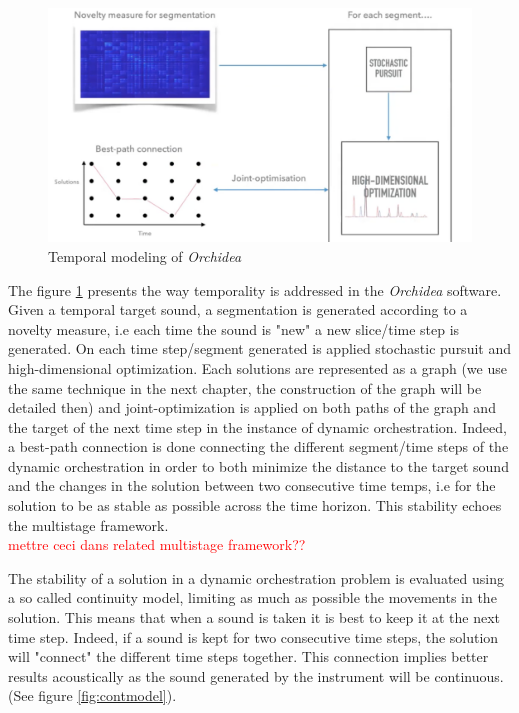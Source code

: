 \documentclass[a4paper]{book}
\newcommand{\alex}[2]{\textcolor{red}{#1}}
\begin{document}
\begin{figure}[ht!]
    \centering
    \includegraphics[scale=0.3]{tempmodel.png}
    \caption{Temporal modeling of \textit{Orchidea}}
    \label{fig:tempmodel}
\end{figure}

The figure \ref{fig:tempmodel} presents the way temporality is addressed in the \textit{Orchidea} software.
Given a temporal target sound, a segmentation is generated according to a novelty measure, i.e each time the sound is "new" a new slice/time step is generated. On each time step/segment generated is applied stochastic pursuit and high-dimensional optimization. Each solutions are represented as a graph (we use the same technique in the next chapter, the construction of the graph will be detailed then) and joint-optimization is applied on both paths of the graph and the target of the next time step in the instance of dynamic orchestration. Indeed, a best-path connection is done connecting the different segment/time steps of the dynamic orchestration in order to both minimize the distance to the target sound and the changes in the solution between two consecutive time temps, i.e for the solution to be as stable as possible across the time horizon. This stability echoes the multistage framework.\\
\alex{mettre ceci dans related multistage framework??}\\

The stability of a solution in a dynamic orchestration problem is evaluated using a so called continuity model, limiting as much as possible the movements in the solution. This means that when a sound is taken it is best to keep it at the next time step. Indeed, if a sound is kept for two consecutive time steps, the solution will "connect" the different time steps together. This connection implies better results acoustically as the sound generated by the instrument will be continuous. (See figure \ref{fig:contmodel}).
\end{document}
